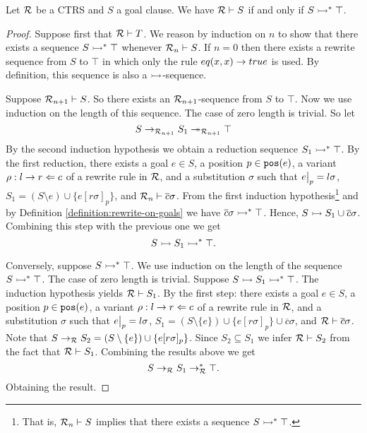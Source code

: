\begin{lemma}\label{lemma:completeness-rewrite-on-goals}
    Let $\mathcal{R}$ be a CTRS and $S$ a goal clause. We have $\mathcal{R} \vdash S$ if and only if $S \rightarrowtail^* \top$.

    \begin{proof}
        Suppose first that $\mathcal{R} \vdash T$. We reason by induction on $n$ to show that there exists a sequence $S \rightarrowtail^* \top$ whenever $\mathcal{R}_n \vdash S$. If $n = 0$ then there exists a rewrite sequence from $S$ to $\top$ in which only the rule $eq(x,x) \rightarrow true$ is used. By definition, this sequence is also a $\rightarrowtail$-sequence.

        Suppose $\mathcal{R}_{n+1} \vdash S$. So there exists an $\mathcal{R}_{n+1}$-sequence from $S$ to $\top$. Now we use induction on the length of this sequence. The case of zero length is trivial. So let
        $$S \rightarrow_{\mathcal{R}_{n+1}} S_1 \twoheadrightarrow_{\mathcal{R}_{n+1}} \top$$
        By the second induction hypothesis we obtain a reduction sequence $S_1 \rightarrowtail^* \top$. By the first reduction, there exists a goal $e \in S$, a position $p \in \mathtt{pos}(e)$, a variant $ \rho : l \rightarrow r \Leftarrow c$ of a rewrite rule in $\mathcal{R}$, and a substitution $\sigma$ such that $\restr{e}{p} = l \sigma$, $S_1 = (S \setminus{e}) \cup \{e[r\sigma]_p\}$, and $\mathcal{R}_n \vdash \overline{c}\sigma$.  From the first induction hypothesis\footnote{That is, $\mathcal{R}_n \vdash S$ implies that there exists a sequence $S \rightarrowtail^* \top$.}
        and by Definition \ref{definition:rewrite-on-goals} we have $\overline{c}\sigma \rightarrowtail^* \top$. Hence, $S \rightarrowtail S_1 \cup \overline{c}\sigma$. Combining this step with the previous one we get
        $$S \rightarrowtail S_1 \rightarrowtail^* \top.$$

        Conversely, suppose $S \rightarrowtail^* \top$. We use induction on the length of the sequence $S \rightarrowtail^* \top$. The case of zero length is trivial. Suppose $S \rightarrowtail S_1 \rightarrowtail^* \top$. The induction hypothesis yields $\mathcal{R} \vdash S_1$. By the first step: there exists a goal $e \in S$, a position $p \in \mathtt{pos}(e)$, a variant $\rho: l \rightarrow r \Leftarrow c$ of a rewrite rule in $\mathcal{R}$, and a substitution $\sigma$ such that $\restr{e}{p} = l \sigma$, $S_1 = (S \setminus \{e\}) \cup \{e[r\sigma]_p\} \cup \overline{c}\sigma$, and $ \mathcal{R} \vdash \overline{c}\sigma$. Note that $S \rightarrow_{\mathcal{R}} S_2 = (S \setminus \{e\}) \cup \{e[r\sigma]_p\}$. Since $S_2 \subseteq S_1$ we infer $\mathcal{R} \vdash S_2$ from the fact that $\mathcal{R} \vdash S_1$. Combining the results above we get
        $$S \rightarrow_{\mathcal{R}} S_1 \rightarrow_{\mathcal{R}}^* \top.$$
        Obtaining the result.
    \end{proof}
\end{lemma}

